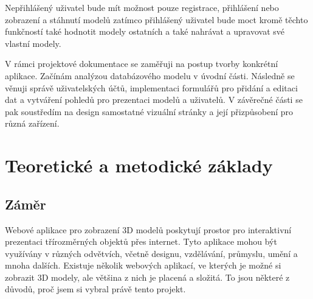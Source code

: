 \documentclass[12pt, a4paper,
oneside,      %
openright
]{report}
\begin{document}
Nepřihlášený uživatel bude mít možnost pouze registrace, přihlášení nebo zobrazení a stáhnutí modelů zatímco přihlášený uživatel bude moct kromě těchto funkčností také hodnotit modely ostatních a také nahrávat a upravovat své vlastní modely.

V rámci projektové dokumentace se zaměřuji na postup tvorby konkrétní aplikace. Začínám analýzou databázového modelu v úvodní části. Následně se věnuji správě uživatelských účtů, implementaci formulářů pro přidání a editaci dat a vytváření pohledů pro prezentaci modelů a uživatelů. V závěrečné části se pak soustředím na design samostatné vizuální stránky a její přizpůsobení pro různá zařízení.


\let\cleardoublepage\clearpage

\chapter{Teoretické a metodické základy}

\section{Záměr}
\label{sec:uvod}

Webové aplikace pro zobrazení 3D modelů poskytují prostor pro interaktivní prezentaci třírozměrných objektů přes internet. Tyto aplikace mohou být využívány v různých odvětvích, včetně designu, vzdělávání, průmyslu, umění a mnoha dalších. Existuje několik webových aplikací, ve kterých je možné si zobrazit 3D modely, ale většina z nich je placená a složitá. To jsou některé z důvodů, proč jsem si vybral právě tento projekt.
\end{document}
